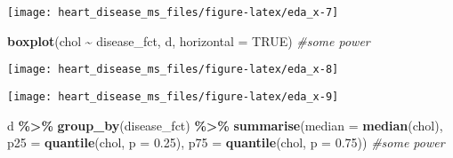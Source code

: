 \documentclass[
]{article}
\newenvironment{Shaded}{\begin{snugshade}}{\end{snugshade}}
\newcommand{\AttributeTok}[1]{\textcolor[rgb]{0.13,0.29,0.53}{#1}}
\newcommand{\CommentTok}[1]{\textcolor[rgb]{0.56,0.35,0.01}{\textit{#1}}}
\newcommand{\ConstantTok}[1]{\textcolor[rgb]{0.56,0.35,0.01}{#1}}
\newcommand{\FloatTok}[1]{\textcolor[rgb]{0.00,0.00,0.81}{#1}}
\newcommand{\FunctionTok}[1]{\textcolor[rgb]{0.13,0.29,0.53}{\textbf{#1}}}
\newcommand{\NormalTok}[1]{#1}
\newcommand{\OtherTok}[1]{\textcolor[rgb]{0.56,0.35,0.01}{#1}}
\newcommand{\SpecialCharTok}[1]{\textcolor[rgb]{0.81,0.36,0.00}{\textbf{#1}}}
\begin{document}
\begin{Shaded}
\end{Shaded}

\begin{center}\texttt{[image: heart\_disease\_ms\_files/figure-latex/eda\_x-7]} \end{center}

\begin{Shaded}
\begin{Highlighting}[]
\FunctionTok{boxplot}\NormalTok{(chol }\SpecialCharTok{\textasciitilde{}}\NormalTok{ disease\_fct, d, }\AttributeTok{horizontal =} \ConstantTok{TRUE}\NormalTok{) }\CommentTok{\#some power}
\end{Highlighting}
\end{Shaded}

\begin{center}\texttt{[image: heart\_disease\_ms\_files/figure-latex/eda\_x-8]} \end{center}

\begin{Shaded}
\end{Shaded}

\begin{center}\texttt{[image: heart\_disease\_ms\_files/figure-latex/eda\_x-9]} \end{center}

\begin{Shaded}
\begin{Highlighting}[]
\NormalTok{d }\SpecialCharTok{\%\textgreater{}\%}
  \FunctionTok{group\_by}\NormalTok{(disease\_fct) }\SpecialCharTok{\%\textgreater{}\%}
  \FunctionTok{summarise}\NormalTok{(}\AttributeTok{median =} \FunctionTok{median}\NormalTok{(chol),}
            \AttributeTok{p25 =} \FunctionTok{quantile}\NormalTok{(chol, }\AttributeTok{p =} \FloatTok{0.25}\NormalTok{),}
            \AttributeTok{p75 =} \FunctionTok{quantile}\NormalTok{(chol, }\AttributeTok{p =} \FloatTok{0.75}\NormalTok{)) }\CommentTok{\#some power}
\end{Highlighting}
\end{Shaded}
\end{document}
